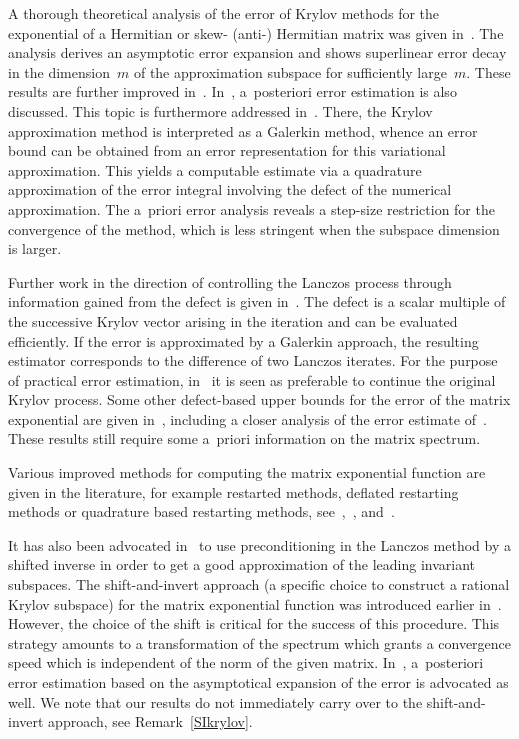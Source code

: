 \documentclass[smallextended]{svjour3pre}%
\numberwithin{equation}{section}
\numberwithin{figure}{section}
\numberwithin{table}{section}
\newcommand\tjnew[1]{{#1}}
\begin{document}
A thorough theoretical analysis of the error of Krylov methods
for the exponential of \tjnew{a Hermitian} or skew- (anti-) Hermitian matrix
was given in~\cite{hoclub97}.
The analysis derives an asymptotic error expansion and
shows superlinear error decay in the dimension~$ m $ of
the approximation subspace for sufficiently large~$ m$.
\tjnew{These results are further improved in~\cite{becrei09}.}
In~\cite{hoclub97}, a~posteriori error estimation is also discussed.
This topic is furthermore addressed in~\cite{lubich08}.
There, the Krylov approximation method is interpreted as a Galerkin method, whence an
error bound can be obtained from an error representation for this variational approximation.
This yields a computable estimate
via a quadrature approximation
of the error integral involving the defect of the numerical
approximation. The a~priori error analysis reveals
a step-size restriction for the convergence of the method,
which is less stringent when the subspace dimension is larger.

Further work in the direction of controlling the Lanczos process through
information gained from the defect is given in~\cite{botchevetal13}.
The defect is a scalar %
multiple of the successive Krylov vector
arising in the iteration and can be evaluated efficiently.
If the error is approximated by a Galerkin approach, the resulting estimator
corresponds to the difference of two Lanczos iterates. For the
purpose of practical error estimation, in~\cite{botchevetal13} it is seen as preferable to
continue the original Krylov process.
\tjnew{Some other defect-based upper bounds for the error
of the matrix exponential are given in~\cite{chinesen17}, including a closer analysis of the error estimate of~\cite{saad92s}.
These results still require some a~priori information on the matrix spectrum.
}

Various improved methods for computing the matrix
exponential function are given in the literature, for example restarted methods, deflated restarting methods
or quadrature based restarting methods, see~\cite{AEEG08a},~\cite{EEG11}, and~\cite{FGS14a}.



It has also been advocated in~\cite{eshhoc06} to use preconditioning in the
Lanczos method by a shifted inverse in order to get a good approximation
of the leading invariant subspaces.
\tjnew{The shift-and-invert approach 
(a specific choice to construct a rational Krylov subspace)
for the matrix exponential function was
introduced earlier in~\cite{mornov04}.}
However, the choice of the shift is
critical for the success of this procedure.
 This strategy amounts to a
transformation of the spectrum which grants a convergence speed which
is independent of the norm of the given matrix.
In~\cite{eshhoc06}, a~posteriori
error estimation based on the asymptotical expansion of the error
is advocated as well.
We note that our results do not immediately carry over to the shift-and-invert approach, see Remark~\ref{SIkrylov}.
\end{document}
